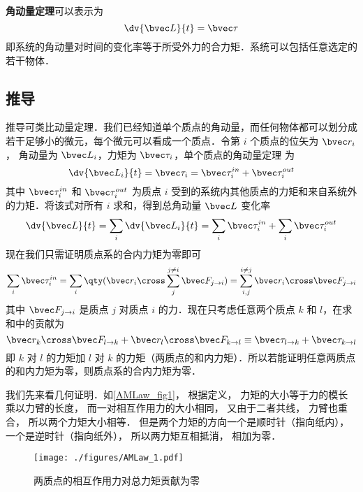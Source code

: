 
\textbf{角动量定理}可以表示为
\begin{equation}\label{AMLaw_eq1}
\dv{\bvec L}{t} = \bvec \tau
\end{equation}
即系统的角动量对时间的变化率等于所受外力的合力矩．系统可以包括任意选定的若干物体．

\subsection{推导}
推导可类比动量定理．我们已经知道单个质点的角动量，而任何物体都可以划分成若干足够小的微元，每个微元可以看成一个质点．令第 $i$ 个质点的位矢为 $\bvec r_i$， 角动量为 $\bvec L_i$，力矩为 $\bvec \tau_i$，单个质点的角动量定理 为
\begin{equation}
\dv{\bvec L_i}{t} = \bvec \tau_i = \bvec \tau_i^{in} + \bvec \tau_i^{out}
\end{equation}
其中 $\bvec \tau_i^{in}$ 和 $\bvec \tau_i^{out}$ 为质点 $i$ 受到的系统内其他质点的力矩和来自系统外的力矩．将该式对所有 $i$ 求和，得到总角动量 $\bvec L$ 变化率
\begin{equation}
\dv{\bvec L}{t} =\sum_i\dv{\bvec L_i}{t} = \sum_i\bvec \tau_i^{in} + \sum_i\bvec \tau_i^{out}
\end{equation}
现在我们只需证明质点系的合内力矩为零即可
\begin{equation}
\sum_i\bvec \tau_i^{in} = \sum_i \qty(\bvec r_i\cross\sum_j^{j\ne i}\bvec F_{j\to i}) = \sum_{i,j}^{i\ne j} \bvec r_i\cross\bvec F_{j\to i}
\end{equation}
其中 $\bvec F_{j\to i}$ 是质点 $j$ 对质点 $i$ 的力．现在只考虑任意两个质点 $k$ 和 $l$，在求和中的贡献为
\begin{equation}
\bvec r_k\cross\bvec F_{l\to k} + \bvec r_l\cross\bvec F_{k\to l} \equiv \bvec \tau_{l\to k}+ \bvec \tau_{k\to l}
\end{equation}
即 $k$ 对 $l$ 的力矩加 $l$ 对 $k$ 的力矩（两质点的和内力矩）．所以若能证明任意两质点的和内力矩为零，则质点系的合内力矩为零．

我们先来看几何证明．如\autoref{AMLaw_fig1}， 根据定义， 力矩的大小等于力的模长乘以力臂的长度， 而一对相互作用力的大小相同， 又由于二者共线， 力臂也重合， 所以两个力矩大小相等． 但是两个力矩的方向一个是顺时针（指向纸内）， 一个是逆时针（指向纸外）， 所以两力矩互相抵消， 相加为零．

\begin{figure}[ht]
\centering
\texttt{[image: ./figures/AMLaw\_1.pdf]}
\caption{两质点的相互作用力对总力矩贡献为零}\label{AMLaw_fig1}
\end{figure}

